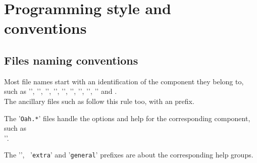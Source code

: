 



\chapter{Programming style and conventions}


\section{Files naming conventions}

Most file names start with an identification of the component they belong to, such as '', '', '', '', '', '', '', '', '' and .\\
The ancillary files such as  follow this rule too, with an  prefix.

The '{\tt *Oah.*}' files handle the options and help for the corresponding component, such as\\ ''.

The '', \, '{\tt extra}' and '{\tt general}' prefixes are about the corresponding help groups.

